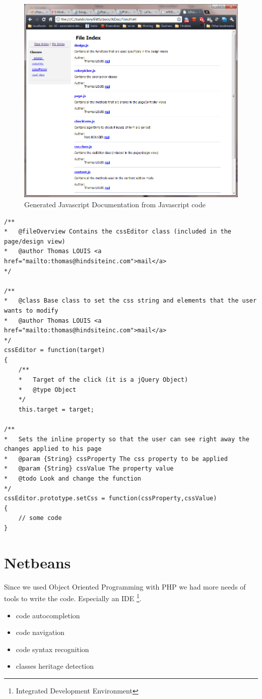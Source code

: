 \begin{figure}[!ht]
\centering
\includegraphics[width=.55\textwidth]{img/jsdoc.png}
\caption{Generated Javascript Documentation from Javascript code}
\label{figure:jsdoc-web}
\end{figure}

\lstset{language=Javascript}
\begin{lstlisting}[label=jsdoc-code,caption=Javascript documentation in a Javascript class]
/**
*	@fileOverview Contains the cssEditor class (included in the page/design view)
*	@author Thomas LOUIS <a href="mailto:thomas@hindsiteinc.com">mail</a>
*/

/**
*	@class Base class to set the css string and elements that the user wants to modify
*	@author Thomas LOUIS <a href="mailto:thomas@hindsiteinc.com">mail</a>
*/
cssEditor = function(target)
{
	/**
	*	Target of the click (it is a jQuery Object)
	*	@type Object
	*/
	this.target = target;

/**
*	Sets the inline property so that the user can see right away the changes applied to his page
*	@param {String} cssProperty The css property to be applied
*	@param {String} cssValue The property value
*	@todo Look and change the function
*/
cssEditor.prototype.setCss = function(cssProperty,cssValue)
{
	// some code		
}

\end{lstlisting}

\section{Netbeans}

Since we used Object Oriented Programming with PHP we had more needs of tools 
to write the code. Especially an IDE \footnote{Integrated Development Environment}.

\begin{itemize}
\item code autocompletion
\item code navigation
\item code syntax recognition
\item classes heritage detection
\end{itemize}


